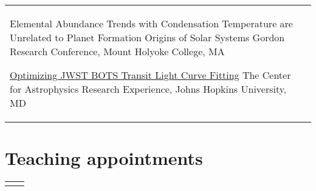 \documentclass[10pt]{article} %
\begin{document}



	
 \begin{supertabular}{L{4cm}@{\hskip 0.3in}L{13cm}}
	{{Elemental Abundance Trends with Condensation Temperature are Unrelated to Planet Formation}}
	{Origins of Solar Systems Gordon Research Conference, Mount Holyoke College, MA}

	{\href{https://sites.krieger.jhu.edu/jhu-care/summer-2022/}{Optimizing JWST BOTS Transit Light Curve Fitting}}
	{The Center for Astrophysics Research Experience, Johns Hopkins University, MD}
\end{supertabular}







	


\section{Teaching appointments} 
    \begin{supertabular}{L{4cm}@{\hskip 0.3in}L{13cm}}
    \end{supertabular}
\end{document}

